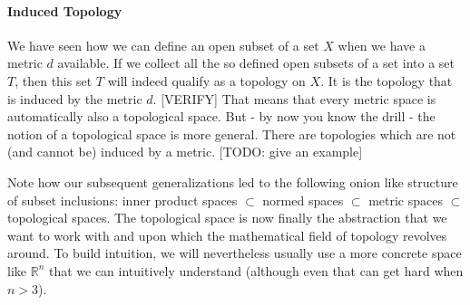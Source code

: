 
\paragraph{Induced Topology} 
We have seen how we can define an open subset of a set $X$ when we have a metric $d$ available. If we collect all the so defined open subsets of a set into a set $T$, then this set $T$ will indeed qualify as a topology on $X$. It is the topology that is induced by the metric $d$. [VERIFY] That means that every metric space is automatically also a topological space. But - by now you know the drill - the notion of a topological space is more general. There are topologies which are not (and cannot be) induced by a metric. [TODO: give an example]


\medskip
Note how our subsequent generalizations led to the following onion like structure of subset inclusions: inner product spaces $\subset$ normed spaces $\subset$ metric spaces $\subset$ topological spaces. The topological space is now finally the abstraction that we want to work with and upon which the mathematical field of topology revolves around. To build intuition, we will nevertheless usually use a more concrete space like $\mathbb{R}^n$ that we can intuitively understand (although even that can get hard when $n > 3$).











